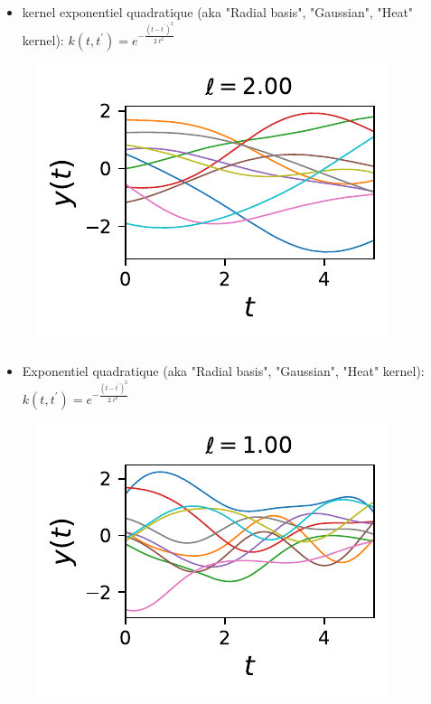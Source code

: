 \documentclass[xcolor=svgnames, t]{beamer}
\begin{document}
\begin{frame}
  \frametitle{\secname}
  
  \begin{itemize}
    \item kernel exponentiel quadratique (aka "Radial basis", "Gaussian", "Heat" kernel):
    $k (t, t^\prime) = e^{- \frac{(t - t^\prime)^2}{2 \ell^2} }$
  \end{itemize}
  \begin{figure}
    \includegraphics{10_gp_time_SquaredExponentialKernel_2.00.pdf}
  \end{figure}
\end{frame}

\begin{frame}
  \frametitle{\secname}

  \begin{itemize}
    \item Exponentiel quadratique (aka "Radial basis", "Gaussian", "Heat" kernel):
    $k (t, t^\prime) = e^{- \frac{(t - t^\prime)^2}{2 \ell^2} }$
  \end{itemize}
  \begin{figure}
    \includegraphics{10_gp_time_SquaredExponentialKernel_1.00.pdf}
  \end{figure}
\end{frame}
\end{document}
